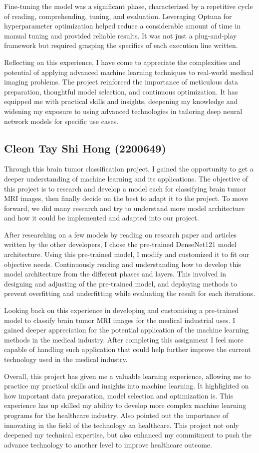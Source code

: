 Fine-tuning the model was a significant phase, characterized by a repetitive cycle of reading, comprehending, tuning, and evaluation. Leveraging Optuna for hyperparameter optimization helped reduce a considerable amount of time in manual tuning and provided reliable results. It was not just a plug-and-play framework but required grasping the specifics of each execution line written.

Reflecting on this experience, I have come to appreciate the complexities and potential of applying advanced machine learning techniques to real-world medical imaging problems. The project reinforced the importance of meticulous data preparation, thoughtful model selection, and continuous optimization. It has equipped me with practical skills and insights, deepening my knowledge and widening my exposure to using advanced technologies in tailoring deep neural network models for specific use cases.

\subsection{Cleon Tay Shi Hong (2200649)}

Through this brain tumor classification project, I gained the opportunity to get a deeper understanding of machine learning and its applications. The objective of this project is to research and develop a model each for classifying brain tumor MRI images, then finally decide on the best to adapt it to the project. To move forward, we did many research and try to understand more model architecture and how it could be implemented and adapted into our project.

After researching on a few models by reading on research paper and articles written by the other developers, I chose the pre-trained DenseNet121 model architecture. Using this pre-trained model, I modify and customized it to fit our objective needs. Continuously reading and understanding how to develop this model architecture from the different phases and layers. This involved in designing and adjusting of the pre-trained model, and deploying methods to prevent overfitting and underfitting while evaluating the result for each iterations.

Looking back on this experience in developing and customising a pre-trained model to classify brain tumor MRI images for the medical industrial uses. I gained deeper appreciation for the potential application of the machine learning methods in the medical industry. After completing this assignment I feel more capable of handling such application that could help further improve the current technology used in the medical industry.

Overall, this project has given me a valuable learning experience, allowing me to practice my practical skills and insights into machine learning. It highlighted on how important data preparation, model selection and optimization is. This experience has up skilled my ability to develop more complex machine learning programs for the healthcare industry. Also pointed out the importance of innovating in the field of the technology an healthcare. This project not only deepened my technical expertise, but also enhanced my commitment to push the advance technology to another level to improve healthcare outcome.
